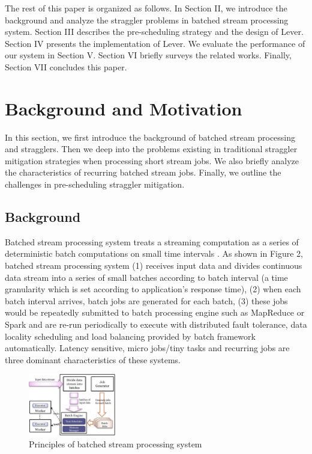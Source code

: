 \documentclass[10pt,conference,compsocconf,letterpaper]{IEEEtran}
\begin{document}
  The rest of this paper is organized as follows. In Section II, we introduce the background and analyze the straggler problems in batched stream processing system. Section III describes the pre-scheduling strategy and the design of Lever. Section IV presents the implementation of Lever. We evaluate the performance of our system in Section V. Section VI briefly surveys the related works. Finally, Section VII concludes this paper.

\section{Background and Motivation}

  In this section, we first introduce the background of batched stream processing and stragglers. Then we deep into the problems existing in traditional straggler mitigation strategies when processing short stream jobs. We also briefly analyze the characteristics of recurring batched stream jobs. Finally, we outline the challenges in pre-scheduling straggler mitigation.

\subsection{Background}

  Batched stream processing system treats a streaming computation as a series of deterministic batch computations on small time intervals \cite{Zaharia2013}. As shown in Figure 2, batched stream processing system (1) receives input data and divides continuous data stream into a series of small batches according to batch interval (a time granularity which is set according to application's response time), (2) when each batch interval arrives, batch jobs are generated for each batch, (3) these jobs would be repeatedly submitted to batch processing engine such as MapReduce or Spark and are re-run periodically to execute with distributed fault tolerance, data locality scheduling and load balancing provided by batch framework automatically. Latency sensitive, micro jobs/tiny tasks and recurring jobs are three dominant characteristics of these systems.
  \begin{figure}[htbp]
    \centering
    \includegraphics[width=0.34\textwidth]{FigureBatchStream}
    \caption{Principles of batched stream processing system}\label{Fig. 2:}
  \end{figure}
\end{document}
